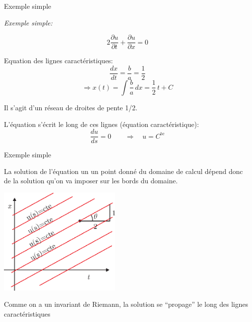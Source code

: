 \documentclass[
mode=present,    %
paper=a4paper,   %
orient=landscape,
display=slides,   %
size=10pt,
style=romain   %
]{powerdot}
\begin{document}
\begin{slide}[toc=Exemple]{Exemple simple}

\emph{Exemple simple:}

\begin{equation*}
2 \frac{\partial u}{\partial t} + \frac{\partial u}{\partial x} = 0
\end{equation*}

\bigskip

Equation des lignes caractéristiques:
\begin{equation*}
\frac{dx}{dt} = \frac{b}{a} = \frac{1}{2}
\end{equation*}
\begin{equation*}
\Rightarrow x(t) = \int \frac{b}{a} \, dx = \frac{1}{2} \, t + C
\end{equation*}

Il s'agit d'un réseau de droites de pente 1/2.

\bigskip

L'équation s'écrit le long de ces lignes (équation caractéristique):
    \begin{equation*}
    \frac{d u}{ds} = 0 \qquad \Rightarrow \quad u=C^{\text{te}}
    \end{equation*}


\end{slide}



\begin{slide}[toc=]{Exemple simple}

La solution de l'équation un un point donné du domaine de calcul dépend donc de la solution qu'on va imposer sur les bords du domaine.

\bigskip

    \centerline{\includegraphics[width=0.45\textwidth]{carac1d.eps} }

\bigskip

Comme on a un invariant de Riemann, la solution se ``propage'' le long des lignes caractéristiques


\end{slide}
\end{document}
